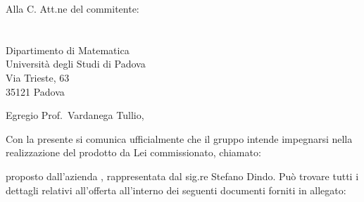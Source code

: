 \documentclass[a4paper,titlepage]{letteracdp}
\date{2017-01-11}
\begin{document}
  \begin{letter}{
    Alla C. Att.ne del commitente: \\
    \COMMITTENTE \\
    \CARDIN      \\
    Dipartimento di Matematica \\
		Università degli Studi di Padova \\
		Via Trieste, 63 \\
		35121 Padova}
    \opening{Egregio Prof.~Vardanega Tullio, }
    Con la presente si comunica ufficialmente che il gruppo intende impegnarsi
    nella realizzazione del prodotto da Lei commissionato, chiamato:
    \begin{center}
      \PROGETTO
    \end{center}
    proposto dall'azienda \PROPONENTE{}, rappresentata dal sig.re Stefano Dindo.
    Può trovare tutti i dettagli relativi all'offerta all'interno dei seguenti
    documenti forniti in allegato:


\end{letter}
\end{document}
